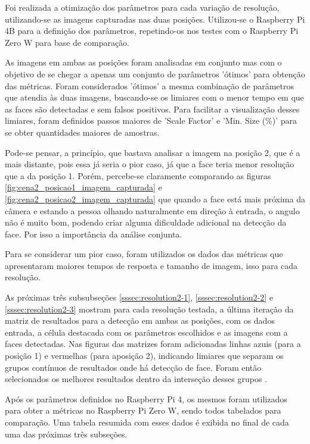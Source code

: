 Foi realizada a otimização dos parâmetros para cada variação de resolução, utilizando-se as imagens capturadas nas duas posições. Utilizou-se o Raspberry Pi 4B para a definição dos parâmetros, repetindo-os nos testes com o Raspberry Pi Zero W para base de comparação.

As imagens em ambas as posições foram analisadas em conjunto mas com o objetivo de se chegar a apenas um conjunto de parâmetros 'ótimos' para obtenção das métricas. Foram considerados 'ótimos' a mesma combinação de parâmetros que atendia às duas imagens, buscando-se os limiares com o menor tempo em que as faces são detectadas e sem falsos positivos. Para facilitar a visualização desses limiares, foram definidos passos maiores de 'Scale Factor' e 'Min. Size (\%)' para se obter quantidades maiores de amostras.

Pode-se pensar, a princípio, que bastava analisar a imagem na posição 2, que é a mais distante, pois essa já seria o pior caso, já que a face teria menor resolução que a da posição 1. Porém, percebe-se claramente comparando as figuras \ref{fig:cena2_posicao1_imagem_capturada} e \ref{fig:cena2_posicao2_imagem_capturada} que quando a face está mais próxima da câmera e estando a pessoa olhando naturalmente em direção à entrada, o angulo não é muito bom, podendo criar alguma dificuldade adicional na detecção da face. Por isso a importância da análise conjunta.

Para se considerar um pior caso, foram utilizados os dados das métricas que apresentaram maiores tempos de resposta e tamanho de imagem, isso para cada resolução.

As próximas três subsubseções \ref{sssec:resolution2-1}, \ref{sssec:resolution2-2} e \ref{sssec:resolution2-3} mostram para cada resolução testada, a última iteração da matriz de resultados para a detecção em ambas as posições, com os dados entrada, a célula destacada com os parâmetros escolhidos e as imagens com a faces detectadas. Nas figuras das matrizes foram adicionadas linhas azuis (para a posição 1) e vermelhas (para aposição 2), indicando limiares que separam os grupos contínuos de resultados onde há detecção de face. Foram então selecionados os melhores resultados dentro da interseção desses grupos .

Após os parâmetros definidos no Raspberry Pi 4, os mesmos foram utilizados para obter a métricas no Raspberry Pi Zero W, sendo todos tabelados para comparação. Uma tabela resumida com esses dados é exibida no final de cada uma das próximas três subseções.

